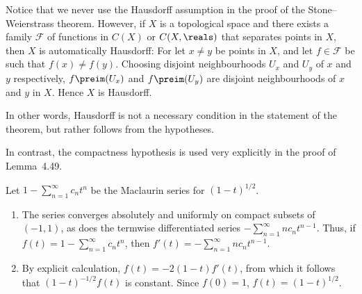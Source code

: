 \documentclass[article, a4paper, 11pt, oneside]{memoir}
\numberwithin{equation}{chapter}
\newcommand{\calF}{\mathcal{F}}
\theoremstyle{nonumberplain}
\begin{document}
\begin{remark}
	Notice that we never use the Hausdorff assumption in the proof of the Stone--Weierstrass theorem. However, if $X$ is a topological space and there exists a family $\calF$ of functions in $C(X)$ or $C(X,\reals)$ that separates points in $X$, then $X$ is automatically Hausdorff: For let $x \neq y$ be points in $X$, and let $f \in \calF$ be such that $f(x) \neq f(y)$. Choosing disjoint neighbourhoods $U_x$ and $U_y$ of $x$ and $y$ respectively, $f\preim(U_x)$ and $f\preim(U_y)$ are disjoint neighbourhoods of $x$ and $y$ in $X$. Hence $X$ is Hausdorff.

	In other words, Hausdorff is not a necessary condition in the statement of the theorem, but rather follows from the hypotheses.

	In contrast, the compactness hypothesis is used very explicitly in the proof of Lemma~4.49.
\end{remark}

\begin{exerciseframed*}[66]
	Let $1 - \sum_{n=1}^\infty c_n t^n$ be the Maclaurin series for $(1 - t)^{1/2}$.
	\begin{enumerate}
		\item The series converges absolutely and uniformly on compact subsets of $(-1,1)$, as does the termwise differentiated series $- \sum_{n=1}^\infty n c_n t^{n-1}$. Thus, if $f(t) = 1 - \sum_{n=1}^\infty c_n t^n$, then $f'(t) = - \sum_{n=1}^\infty n c_n t^{n-1}$.

		\item By explicit calculation, $f(t) = -2(1-t) f'(t)$, from which it follows that $(1-t)^{-1/2} f(t)$ is constant. Since $f(0) = 1$, $f(t) = (1-t)^{1/2}$.
	\end{enumerate}
\end{exerciseframed*}
\end{document}
